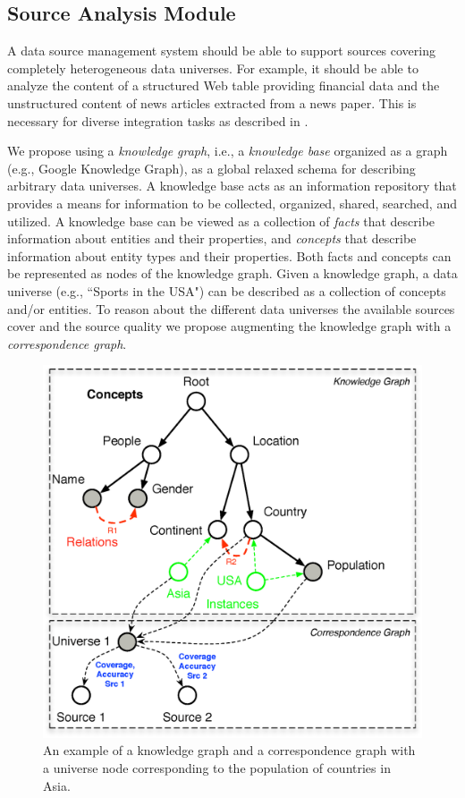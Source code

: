 \documentclass{sig-alternate}
\begin{document}
\subsection{Source Analysis Module}
A data source management system should be able to support sources covering completely heterogeneous data universes. For example, it should be able to analyze the content of a structured Web table providing financial data and the unstructured content of news articles extracted from a news paper. This is necessary for diverse integration tasks as described in . 

We propose using a {\em knowledge graph}, i.e., a {\em knowledge base} organized as a graph (e.g., Google Knowledge Graph), as a global relaxed schema for describing arbitrary data universes. A knowledge base acts as an information repository that provides a means for information to be collected, organized, shared, searched, and utilized. A knowledge base can be viewed as a collection of {\em facts} that describe information about entities and their properties, and {\em concepts} that describe information about entity types and their properties. Both facts and concepts can be represented as nodes of the knowledge graph. Given a knowledge graph, a data universe (e.g., ``Sports in the USA") can be described as a collection of concepts and/or entities. To reason about the different data universes the available sources cover and the source quality we propose augmenting the knowledge graph with a {\em correspondence graph}.

\begin{figure}
	\begin{center}
	\includegraphics[clip,scale=0.4]{fig/kgcg}
	\caption{An example of a knowledge graph and a correspondence graph with a universe node corresponding to the population of countries in Asia.}
	\label{fig:kgcg}
	\end{center}
	\vspace{-20pt}
\end{figure}
\end{document}
